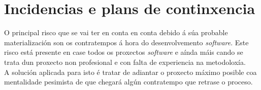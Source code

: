\section{Incidencias e plans de continxencia}
O principal risco que se vai ter en conta en conta debido á súa probable materialización son os contratempos á hora do desenvolvemento \textit{software}. Este risco está presente en case todos os proxectos \textit{software} e aínda máis cando se trata dun proxecto non profesional e con falta de experiencia na metodoloxía.\\
A solución aplicada para isto é tratar de adiantar o proxecto máximo posible coa mentalidade pesimista de que chegará algún contratempo que retrase o proceso.

 \let\cleardoublepage=\clearpage 